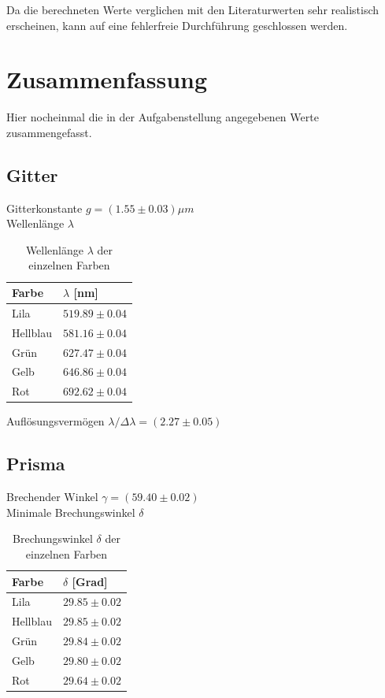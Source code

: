 \documentclass[12pt,a4paper,twoside]{article}
\begin{document}
\noindent
Da die berechneten Werte verglichen mit den Literaturwerten sehr realistisch erscheinen, kann auf eine fehlerfreie Durchführung geschlossen werden. 

\section{Zusammenfassung} %
Hier nocheinmal die in der Aufgabenstellung angegebenen Werte zusammengefasst. 

\subsection{Gitter}
Gitterkonstante  $g = (1.55 \pm 0.03)\mu m$ \\
Wellenlänge $\lambda$

\begin{table}[H]
    \centering
    \caption{Wellenlänge $\lambda$ der einzelnen Farben}
    \label{tab:zus wellenlänge gitter}
    \begin{tabular}{| l | l |}
        \hline
        Farbe & $\lambda$ [nm] \\
        \hline
        Lila        & $ 519.89 \pm 0.04 $ \\
        Hellblau    & $ 581.16 \pm 0.04 $ \\
        Grün        & $ 627.47 \pm 0.04 $ \\
        Gelb        & $ 646.86 \pm 0.04 $ \\
        Rot         & $ 692.62 \pm 0.04 $ \\
        \hline
    \end{tabular}
\end{table}

\noindent
Auflösungsvermögen $\lambda / \Delta \lambda = (2.27 \pm 0.05)$

\subsection{Prisma}
Brechender Winkel $\gamma = (59.40 \pm 0.02)$ \\
Minimale Brechungswinkel $\delta$ \\

\begin{table}[H]
    \centering
    \caption{Brechungswinkel $\delta$ der einzelnen Farben}
    \label{tab:zus delta scheiß}
    \begin{tabular}{| l | l |}
        \hline
        Farbe & $\delta$ [Grad] \\
        \hline
        Lila        & $ 29.85 \pm 0.02 $ \\
        Hellblau    & $ 29.85 \pm 0.02 $ \\
        Grün        & $ 29.84 \pm 0.02 $ \\
        Gelb        & $ 29.80 \pm 0.02 $ \\
        Rot         & $ 29.64 \pm 0.02 $ \\
        \hline
    \end{tabular}
\end{table}
\end{document}
